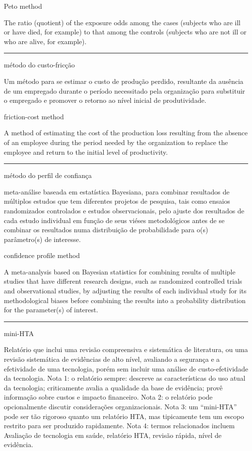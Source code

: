 \documentclass[
]{book}
\begin{document}
Peto method

The ratio (quotient) of the exposure odds among the cases (subjects who are ill or have died, for example) to that among the controls (subjects who are not ill or who are alive, for example).

\begin{center}\rule{0.5\linewidth}{0.5pt}\end{center}

método do custo-fricção

Um método para se estimar o custo de produção perdido, resultante da ausência de um empregado durante o período necessitado pela organização para substituir o empregado e promover o retorno ao nível inicial de produtividade.

friction-cost method

A method of estimating the cost of the production loss resulting from the absence of an employee during the period needed by the organization to replace the employee and return to the initial level of productivity.

\begin{center}\rule{0.5\linewidth}{0.5pt}\end{center}

método do perfil de confiança

meta-análise baseada em estatística Bayesiana, para combinar resultados de múltiplos estudos que tem diferentes projetos de pesquisa, tais como ensaios randomizados controlados e estudos observacionais, pelo ajuste dos resultados de cada estudo individual em função de seus viéses metodológicos antes de se combinar os resultados numa distribuição de probabilidade para o(s) parâmetro(s) de interesse.

confidence profile method

A meta-analysis based on Bayesian statistics for combining results of multiple studies that have different research designs, such as randomized controlled trials and observational studies, by adjusting the results of each individual study for its methodological biases before combining the results into a probability distribution for the parameter(s) of interest.

\begin{center}\rule{0.5\linewidth}{0.5pt}\end{center}

mini-HTA

Relatório que inclui uma revisão compreensiva e sistemática de literatura, ou uma revisão sistemática de evidências de alto nível, avaliando a segurança e a efetividade de uma tecnologia, porém sem incluir uma análise de custo-efetividade da tecnologia. Nota 1: o relatório sempre: descreve as características do uso atual da tecnologia; criticamente avalia a qualidade da base de evidência; provê informação sobre custos e impacto financeiro. Nota 2: o relatório pode opcionalmente discutir considerações organizacionais. Nota 3: um ``mini-HTA'' pode ser tão rigoroso quanto um relatório HTA, mas tipicamente tem um escopo restrito para ser produzido rapidamente. Nota 4: termos relacionados incluem Avaliação de tecnologia em saúde, relatório HTA, revisão rápida, nível de evidência.
\end{document}
